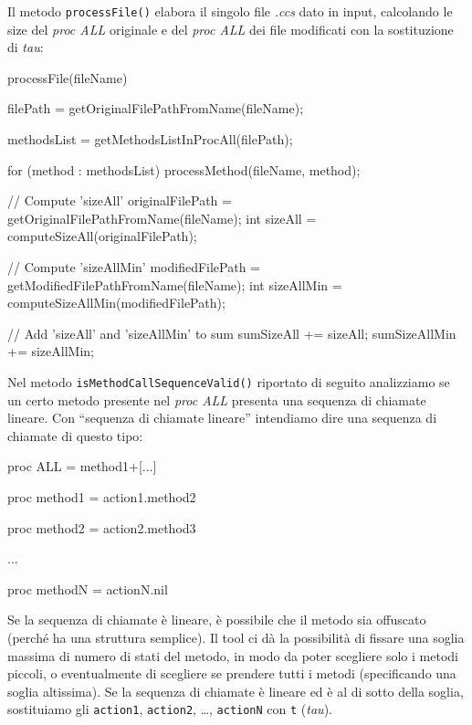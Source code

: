 Il metodo \verb|processFile()| elabora il singolo file \textit{.ccs} dato in input, calcolando le size del \textit{proc ALL} originale e del \textit{proc ALL} dei file modificati con la sostituzione di \textit{tau}:

\begin{myalgorithm}[caption={Pseudocodice metodo processFile()}, label={cod:pseudocodice-metodo-processfile}]
processFile(fileName) {
  filePath = getOriginalFilePathFromName(fileName);

  methodsList = getMethodsListInProcAll(filePath);

  for (method : methodsList) {
    processMethod(fileName, method);
  }

  // Compute 'sizeAll'
  originalFilePath = getOriginalFilePathFromName(fileName);
  int sizeAll = computeSizeAll(originalFilePath);

  // Compute 'sizeAllMin'
  modifiedFilePath = getModifiedFilePathFromName(fileName);
  int sizeAllMin = computeSizeAllMin(modifiedFilePath);

  // Add 'sizeAll' and 'sizeAllMin' to sum
  sumSizeAll += sizeAll;
  sumSizeAllMin += sizeAllMin;
}
\end{myalgorithm}

Nel metodo \verb|isMethodCallSequenceValid()| riportato di seguito analizziamo se un certo metodo presente nel \textit{proc ALL} presenta una sequenza di chiamate lineare. Con ``sequenza di chiamate lineare'' intendiamo dire una sequenza di chiamate di questo tipo:

\begin{myalgorithm}[caption={Modello di sequenza di chiamate lineari}, label={cod:modello-sequenza-di-chiamate-lineari}]
proc ALL = method1+[...]

proc method1 = action1.method2

proc method2 = action2.method3

...

proc methodN = actionN.nil
\end{myalgorithm}

Se la sequenza di chiamate è lineare, è possibile che il metodo sia offuscato (perché ha una struttura semplice). Il tool ci dà la possibilità di fissare una soglia massima di numero di stati del metodo, in modo da poter scegliere solo i metodi piccoli, o eventualmente di scegliere se prendere tutti i metodi (specificando una soglia altissima). Se la sequenza di chiamate è lineare ed è al di sotto della soglia, sostituiamo gli \verb|action1|, \verb|action2|, \dots, \verb|actionN| con \verb|t| (\textit{tau}).


